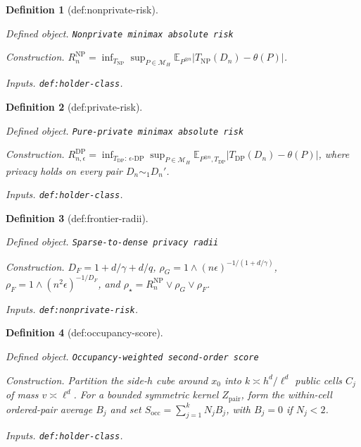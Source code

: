 \documentclass{article}
\newtheorem{definition}{Definition}
\begin{document}
\begin{definition}[def:nonprivate-risk]\label{def:nonprivate-risk}
\par\smallskip\noindent\emph{Defined object.} \texttt{Nonprivate minimax absolute risk}
\par\smallskip\noindent\emph{Construction.} \(R_n^{\mathrm{NP}}=\inf_{T_{\mathrm{NP}}}\sup_{P\in\mathcal M_H}\mathbb E_{P^{\otimes n}}|T_{\mathrm{NP}}(D_n)-\theta(P)|\).
\par\smallskip\noindent\emph{Inputs.} \texttt{def:\allowbreak{}holder-\allowbreak{}class}.
\end{definition}

\begin{definition}[def:private-risk]\label{def:private-risk}
\par\smallskip\noindent\emph{Defined object.} \texttt{Pure-\allowbreak{}private minimax absolute risk}
\par\smallskip\noindent\emph{Construction.} \(R_{n,\epsilon}^{\mathrm{DP}}=\inf_{T_{\mathrm{DP}}:\,\epsilon\text{-DP}}\sup_{P\in\mathcal M_H}\mathbb E_{P^{\otimes n},T_{\mathrm{DP}}}|T_{\mathrm{DP}}(D_n)-\theta(P)|\), where privacy holds on every pair \(D_n\sim_1D_n'\).
\par\smallskip\noindent\emph{Inputs.} \texttt{def:\allowbreak{}holder-\allowbreak{}class}.
\end{definition}

\begin{definition}[def:frontier-radii]\label{def:frontier-radii}
\par\smallskip\noindent\emph{Defined object.} \texttt{Sparse-\allowbreak{}to-\allowbreak{}dense privacy radii}
\par\smallskip\noindent\emph{Construction.} \(D_F=1+d/\gamma+d/q\), \(\rho_G=1\wedge(n\epsilon)^{-1/(1+d/\gamma)}\), \(\rho_F=1\wedge(n^2\epsilon)^{-1/D_F}\), and \(\rho_\star=R_n^{\mathrm{NP}}\vee\rho_G\vee\rho_F\).
\par\smallskip\noindent\emph{Inputs.} \texttt{def:\allowbreak{}nonprivate-\allowbreak{}risk}.
\end{definition}

\begin{definition}[def:occupancy-score]\label{def:occupancy-score}
\par\smallskip\noindent\emph{Defined object.} \texttt{Occupancy-\allowbreak{}weighted second-\allowbreak{}order score}
\par\smallskip\noindent\emph{Construction.} Partition the side-\(h\) cube around \(x_0\) into \(k\asymp h^d/\ell^d\) public cells \(C_j\) of mass \(v\asymp\ell^d\). For a bounded symmetric kernel \(Z_{\mathrm{pair}}\), form the within-cell ordered-pair average \(B_j\) and set \(S_{\mathrm{occ}}=\sum_{j=1}^kN_jB_j\), with \(B_j=0\) if \(N_j<2\).
\par\smallskip\noindent\emph{Inputs.} \texttt{def:\allowbreak{}holder-\allowbreak{}class}.
\end{definition}
\end{document}
